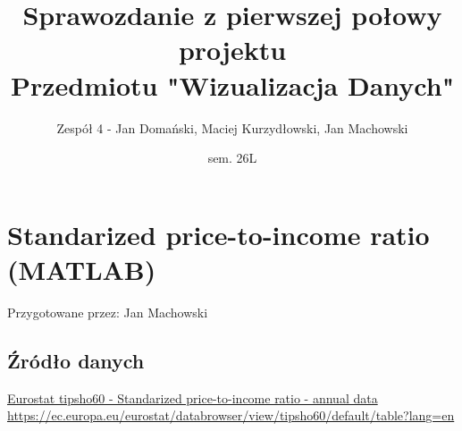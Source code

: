 \documentclass[12pt]{article}
\title{Sprawozdanie z pierwszej połowy projektu\\
Przedmiotu "Wizualizacja Danych"}
\author{Zespół 4 - Jan Domański, Maciej Kurzydłowski, Jan Machowski}
\date{sem. 26L}
\begin{document}
\maketitle
\tableofcontents
\newpage





\section{Standarized price-to-income ratio (MATLAB)}

Przygotowane przez: Jan Machowski

\subsection{Źródło danych}
\href{https://ec.europa.eu/eurostat/databrowser/view/tipsho60/default/table?lang=en}{Eurostat tipsho60 - Standarized price-to-income ratio - annual data}\\
\url{https://ec.europa.eu/eurostat/databrowser/view/tipsho60/default/table?lang=en}
\end{document}
